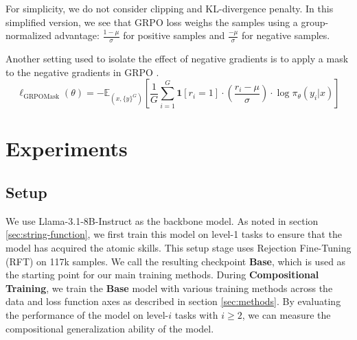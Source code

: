\documentclass[12pt]{cmuthesis}
\begin{document}
For simplicity, we do not consider clipping and KL-divergence penalty. In this simplified version, we see that GRPO loss weighs the samples using a group-normalized advantage: $\frac{1- \mu}{\sigma}$ for positive samples and $\frac{-\mu}{\sigma}$ for negative samples.


Another setting used to isolate the effect of negative gradients is to apply a mask to the negative gradients in GRPO \citep{setlurE3LearningExplore2025}.
\begin{equation}
    \ell_{\text{GRPOMask}}(\theta) = - \mathbb{E}_{(x, \{y\}^G)} \left[ \frac{1}{G} \sum_{i = 1}^G \boldsymbol{1}[r_i = 1] \cdot \left( \frac{r_i - \mu}{\sigma} \right) \cdot \log \pi_\theta(y_i \vert x) \right]
    \label{eq:GRPOMask}
\end{equation}





\chapter{Experiments}
\label{sec:experiments}
\section{Setup}
We use Llama-3.1-8B-Instruct as the backbone model. As noted in section \ref{sec:string-function}, we first train this model on level-1 tasks to ensure that the model has acquired the atomic skills. This setup stage uses Rejection Fine-Tuning (RFT) on 117k samples. We call the resulting checkpoint \textbf{Base}, which is used as the starting point for our main training methods.
During \textbf{Compositional Training}, we train the \textbf{Base} model with various training methods across the data and loss function axes as described in section \ref{sec:methods}. By evaluating the performance of the model on level-$i$ tasks with $i \ge 2$, we can measure the compositional generalization ability of the model.
\end{document}
